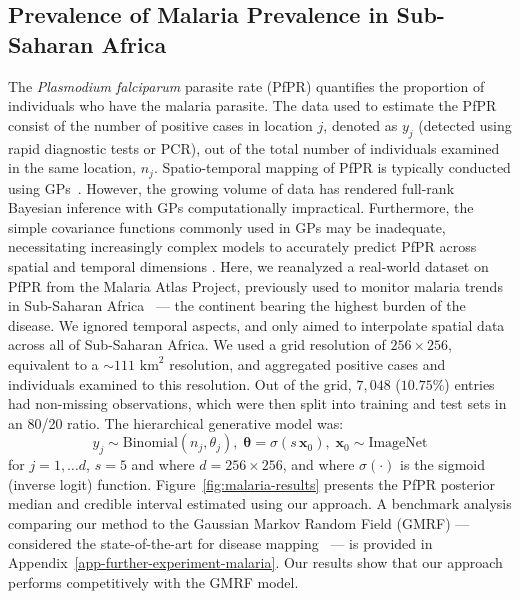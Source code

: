 \subsection{Prevalence of Malaria Prevalence in Sub-Saharan Africa}
\label{sec-experiment-malaria}
The \emph{Plasmodium falciparum} parasite rate (PfPR) quantifies the proportion of individuals who have the malaria parasite. The data used to estimate the PfPR consist of the number of positive cases in location $j$, denoted as $y_j$ (detected using rapid diagnostic tests or PCR), out of the total number of individuals examined in the same location, $n_j$. Spatio-temporal mapping of PfPR is typically conducted using GPs~\cite{Bhatt2015-uk}. However, the growing volume of data has rendered full-rank Bayesian inference with GPs computationally impractical. Furthermore, the simple covariance functions commonly used in GPs may be inadequate, necessitating increasingly complex models to accurately predict PfPR across spatial and temporal dimensions \cite{Bhatt2017-tk}. 
Here, we reanalyzed a real-world dataset on PfPR from the Malaria Atlas Project, previously used to monitor malaria trends in Sub-Saharan Africa~\citep{Bhatt2015-uk,Pfeffer2018-cm, Weiss2019-au} --- the continent bearing the highest burden of the disease. 
We ignored temporal aspects, and only aimed to interpolate spatial data across all of Sub-Saharan Africa. We used a grid resolution of $256 \times 256$, equivalent to a $\sim 111 \text{ km}^2$ resolution, and aggregated positive cases and individuals examined to this resolution. Out of the grid, $7,048$ ($10.75$\%) entries had non-missing observations, which were then split into training and test sets in an 80/20 ratio. The hierarchical generative model was:
\begin{equation*}
y_{j} \sim \text{Binomial}(n_j,\theta_j), \; \boldsymbol{\theta} = \sigma(s\,\mathbf{x}_0), \;
\mathbf{x}_0 \sim \text{ImageNet}
\end{equation*}
for $j = 1, \ldots d$, $s = 5$ and where $d = 256\times 256$, and where $\sigma(\cdot)$ is the sigmoid (inverse logit) function.
Figure~\ref{fig:malaria-results} presents the PfPR posterior median and credible interval estimated using our approach. A benchmark analysis comparing our method to the Gaussian Markov Random Field (GMRF) --- considered the state-of-the-art for disease mapping~\citep{Rue2009-ty, Lindgren2011-fv, Heaton2017-vl} --- is provided in Appendix~\ref{app-further-experiment-malaria}. Our results show that our approach performs competitively with the GMRF model.

